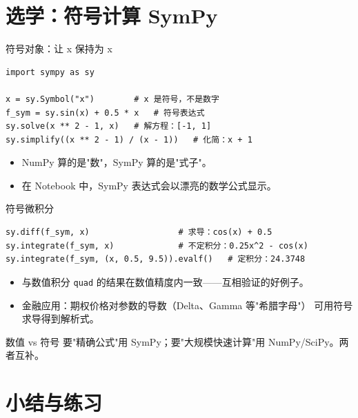 \documentclass[9pt]{ctexbeamer}
\begin{document}
\section{选学：符号计算 SymPy}

\begin{frame}[fragile]{符号对象：让 x 保持为 x}
	\begin{lstlisting}
import sympy as sy

x = sy.Symbol("x")        # x 是符号，不是数字
f_sym = sy.sin(x) + 0.5 * x   # 符号表达式
sy.solve(x ** 2 - 1, x)   # 解方程：[-1, 1]
sy.simplify((x ** 2 - 1) / (x - 1))   # 化简：x + 1
\end{lstlisting}
	\begin{itemize}
		\item NumPy 算的是"数"，SymPy 算的是"式子"。
		\item 在 Notebook 中，SymPy 表达式会以漂亮的数学公式显示。
	\end{itemize}
\end{frame}

\begin{frame}[fragile]{符号微积分}
	\begin{lstlisting}
sy.diff(f_sym, x)                  # 求导：cos(x) + 0.5
sy.integrate(f_sym, x)             # 不定积分：0.25x^2 - cos(x)
sy.integrate(f_sym, (x, 0.5, 9.5)).evalf()   # 定积分：24.3748
\end{lstlisting}
	\begin{itemize}
		\item 与数值积分 \texttt{quad} 的结果在数值精度内一致——互相验证的好例子。
		\item 金融应用：期权价格对参数的导数（Delta、Gamma 等"希腊字母"）
			可用符号求导得到解析式。
	\end{itemize}
	\begin{alertblock}{数值 vs 符号}
		要"精确公式"用 SymPy；要"大规模快速计算"用 NumPy/SciPy。两者互补。
	\end{alertblock}
\end{frame}


\section{小结与练习}
\end{document}

